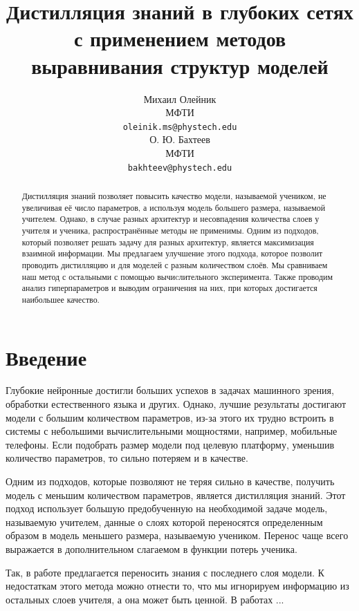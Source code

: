\documentclass[14]{article}
\title{Дистилляция знаний в глубоких сетях с применением методов выравнивания структур моделей}
\author{ Михаил Олейник \\ 
  МФТИ \\
  \texttt{oleinik.ms@phystech.edu} \\
  \And
  О. Ю. Бахтеев \\ 
  МФТИ \\ 
  \texttt{bakhteev@phystech.edu} \\
}
\date{}
\begin{document}
\maketitle

\begin{abstract}
  Дистилляция знаний позволяет повысить качество модели, называемой учеником, не увеличивая её число параметров,
  а используя модель большего размера, называемой учителем.
  Однако, в случае разных архитектур и несовпадения количества слоев у учителя и ученика, распространённые методы не применимы.
  Одним из подходов, который позволяет решать задачу для разных архитектур, является максимизация взаимной информации.
  Мы предлагаем улучшение этого подхода, которое позволит проводить дистилляцию и для моделей с разным количеством слоёв.
  Мы сравниваем наш метод с остальными с помощью вычиcлительного эксперимента.
  Также проводим анализ гиперпараметров и выводим ограничения на них, при которых достигается наибольшее качество.
\end{abstract}



\section{Введение}
Глубокие нейронные достигли больших успехов в задачах машинного зрения, обработки естественного языка и других.
Однако, лучшие результаты достигают модели с большим количеством параметров,
из-за этого их трудно встроить в системы с небольшими вычислительными мощностями, например, мобильные телефоны.
Если подобрать размер модели под целевую платформу, уменьшив количество параметров, то сильно потеряем и в качестве.

Одним из подходов, которые позволяют не теряя сильно в качестве, получить модель с меньшим количеством параметров, является дистилляция знаний.
Этот подход использует большую предобученную на необходимой задаче модель, называемую учителем,
данные о слоях которой переносятся определенным образом в модель меньшего размера, называемую учеником.
Перенос чаще всего выражается в дополнительном слагаемом в функции потерь ученика.

Так, в работе \cite{hinton2015distilling} предлагается переносить знания с последнего слоя модели.
К недостаткам этого метода можно отнести то, что мы игнорируем информацию из остальных слоев учителя, а она может быть ценной.
В работах ...
\end{document}
